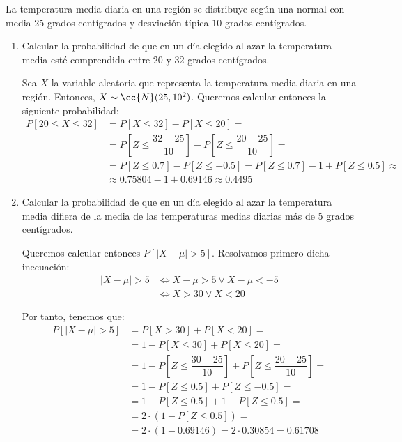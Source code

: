 \begin{ejercicio}
    La temperatura media diaria en una región se distribuye según una normal con media 25 grados centígrados y desviación típica $10$ grados centígrados.
    \begin{enumerate}
        \item Calcular la probabilidad de que en un día elegido al azar la temperatura media esté comprendida entre $20$ y $32$ grados centígrados.
        
        Sea $X$ la variable aleatoria que representa la temperatura media diaria en una región. Entonces, $X\sim \cc{N}(25,10^2)$. Queremos calcular entonces la siguiente probabilidad:
        \begin{align*}
            P[20\leq X\leq 32] &= P[X\leq 32] - P[X\leq 20] =\\&= P\left[Z\leq \dfrac{32-25}{10}\right] - P\left[Z\leq \dfrac{20-25}{10}\right] =\\&= P\left[Z\leq 0.7\right] - P\left[Z\leq -0.5\right]
            = P[Z\leq 0.7] - 1 + P[Z\leq 0.5] \approx\\&\approx 0.75804 - 1 + 0.69146 \approx 0.4495
        \end{align*}


        \item Calcular la probabilidad de que en un día elegido al azar la temperatura media difiera de la media de las temperaturas medias diarias más de 5 grados centígrados.
        
        Queremos calcular entonces $P[|X-\mu|>5]$. Resolvamos primero dicha inecuación:
        \begin{align*}
            |X-\mu|>5 &\Longleftrightarrow X-\mu>5 \vee X-\mu<-5\\
            &\Longleftrightarrow X>30 \vee X<20
        \end{align*}

        Por tanto, tenemos que:
        \begin{align*}
            P[|X-\mu|>5] &= P[X>30] + P[X<20] =\\&= 1-P[X\leq 30] + P[X\leq 20] =\\&= 1-P\left[Z\leq \dfrac{30-25}{10}\right] + P\left[Z\leq \dfrac{20-25}{10}\right] =\\&= 1-P[Z\leq 0.5] + P[Z\leq -0.5] =\\&=
            1-P[Z\leq 0.5] + 1-P[Z\leq 0.5] =\\&= 2\cdot (1-P[Z\leq 0.5]) =\\&= 2\cdot (1-0.69146) = 2\cdot 0.30854 = 0.61708
        \end{align*}
    \end{enumerate}
\end{ejercicio}

